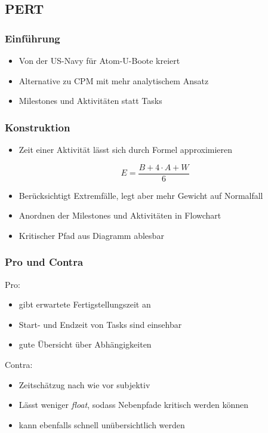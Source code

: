 \documentclass[%
	handout
]{beamer}
\begin{document}
	\subsection{PERT}
		\begin{frame}
			\frametitle{Einführung}
			\begin{itemize}
				\item Von der US-Navy für Atom-U-Boote kreiert\pause
				\item Alternative zu CPM mit mehr analytischem Ansatz\pause
				\item Milestones und Aktivitäten statt Tasks
			\end{itemize}
		\end{frame}
		
		\begin{frame}
			\frametitle{Konstruktion}
			\begin{itemize}
				\item Zeit einer Aktivität lässt sich durch Formel approximieren\pause
			\end{itemize}
			\[
				E = \frac{B +4\cdot A+W}{6}
			\]\pause
			\begin{itemize}
				\item Berücksichtigt Extremfälle, legt aber mehr Gewicht auf Normalfall\pause
				\item Anordnen der Milestones und Aktivitäten in Flowchart\pause
				\item Kritischer Pfad aus Diagramm ablesbar
			\end{itemize}
		\end{frame}
		
		\begin{frame}
			\frametitle{Pro und Contra}
			\begin{minipage}[t]{.48\textwidth}
				Pro:
				\begin{itemize}
					\item gibt erwartete Fertigstellungszeit an
					\item Start- und Endzeit von Tasks sind einsehbar
					\item gute Übersicht über Abhängigkeiten
				\end{itemize}
			\end{minipage}
			\begin{minipage}[t]{.48\textwidth}
				Contra:
				\begin{itemize}
					\item Zeitschätzug nach wie vor subjektiv
					\item Lässt weniger \textit{float}, sodass Nebenpfade kritisch werden können
					\item kann ebenfalls schnell unübersichtlich werden
				\end{itemize}
			\end{minipage}
		\end{frame}
		
\end{document}

